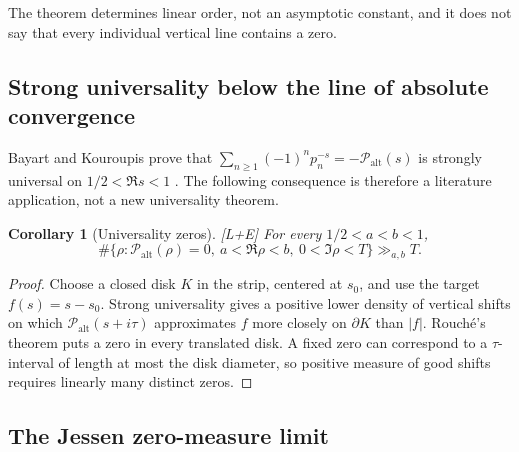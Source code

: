 \documentclass[11pt]{article}
\newtheorem{corollary}[theorem]{Corollary}
\theoremstyle{definition}
\theoremstyle{remark}
\newcommand{\Palt}{\mathcal P_{\mathrm{alt}}}
\newcommand{\status}[1]{\textnormal{\textcolor{accent}{\footnotesize[#1]}}}
\begin{document}
The theorem determines linear order, not an asymptotic constant, and it does not say that
every individual vertical line contains a zero.

\subsection{Strong universality below the line of absolute convergence}

Bayart and Kouroupis prove that
$\sum_{n\ge1}(-1)^np_n^{-s}=-\Palt(s)$ is strongly universal on
$1/2<\Re s<1$ \cite[Corollary 1.4]{BayartKouroupis}.  The following consequence is therefore a
literature application, not a new universality theorem.

\begin{corollary}[Universality zeros]\label{cor:Palt-universal-zeros}
\status{L+E}
For every $1/2<a<b<1$,
\begin{equation}\label{eq:Palt-universal-zeros}
 \#\{\rho:\Palt(\rho)=0,\ a<\Re\rho<b,\ 0<\Im\rho<T\}
 \gg_{a,b}T.
\end{equation}
\end{corollary}

\begin{proof}
Choose a closed disk $K$ in the strip, centered at $s_0$, and use the target
$f(s)=s-s_0$.  Strong universality gives a positive lower density of vertical shifts on
which $\Palt(s+i\tau)$ approximates $f$ more closely on $\partial K$ than
$|f|$.  Rouch\'e's theorem puts a zero in every translated disk.  A fixed zero can
correspond to a $\tau$-interval of length at most the disk diameter, so positive measure
of good shifts requires linearly many distinct zeros.
\end{proof}

\subsection{The Jessen zero-measure limit}
\end{document}

